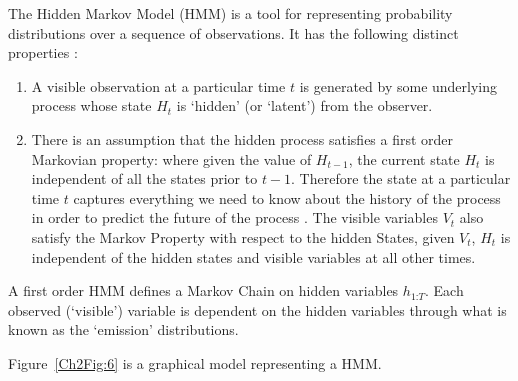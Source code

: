 The Hidden Markov Model (HMM) is a tool for representing probability distributions over a sequence of observations. It has the following distinct properties \autocite{ghahramani2001introduction}:

\begin{enumerate}
  \item A visible observation at a particular time $t$ is generated by some underlying process whose state $H_t$ is `hidden' (or `latent') from the observer.
  \item There is an assumption that the hidden process satisfies a first order Markovian property: where given the value of $H_{t-1}$, the current state $H_t$ is independent of all the states prior to $t-1$. Therefore the state at a particular time $t$ captures everything we need to know about the history of the process in order to predict the future of the process \autocite{ghahramani2001introduction}. The visible variables $V_t$ also satisfy the Markov Property with respect to the hidden States, given $V_t$, $H_t$ is independent of the hidden states and visible variables at all other times.
\end{enumerate}

A first order HMM defines a Markov Chain on hidden variables $h_{1\text{:}T}$. Each observed (`visible') variable is dependent on the hidden variables through what is known as the `emission' distributions.

Figure~\ref{Ch2Fig:6} is a graphical model representing a HMM.

